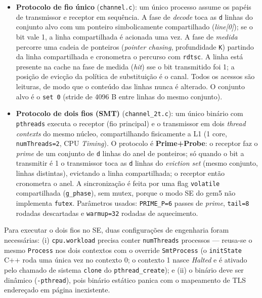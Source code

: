 \begin{itemize}
    \item \textbf{Protocolo de fio único} (\texttt{channel.c}): um único
          processo assume os papéis de transmissor e receptor em sequência.
          A fase de \textit{decode} toca as \texttt{d} linhas do conjunto
          alvo com um ponteiro simbolicamente compartilhado
          (\textit{line[0]}); se o bit vale 1, a linha compartilhada é
          acionada uma vez. A fase de \textit{medida} percorre uma cadeia de
          ponteiros (\textit{pointer chasing}, profundidade \texttt{K})
          partindo da linha compartilhada e cronometra o percurso com
          \texttt{rdtsc}. A linha está presente na cache na fase de medida
          (\textit{hit}) sse o bit transmitido foi 1; a posição de evicção da
          política de substituição é o canal. Todos os acessos são leituras, de
          modo que o conteúdo das linhas nunca é alterado. O conjunto alvo é o
          \texttt{set 0} (stride de 4096 B entre linhas do mesmo conjunto).
    \item \textbf{Protocolo de dois fios (SMT)} (\texttt{channel\_2t.c}):
          um único binário com \texttt{pthreads} executa o receptor (fio
          principal) e o transmissor em dois \textit{thread contexts} do
          mesmo núcleo, compartilhando fisicamente a L1 (1 core,
          \texttt{numThreads=2}, CPU \textit{Timing}). O protocolo é
          \textbf{Prime+Probe}: o receptor faz o \textit{prime} de um
          conjunto de \texttt{d} linhas do anel de ponteiros; só quando o bit
          a transmitir é 1 o transmissor toca as \texttt{d} linhas do
          \textit{eviction set} (mesmo conjunto, linhas distintas), evictando
          a linha compartilhada; o receptor então cronometra o anel. A
          sincronização é feita por uma flag \texttt{volatile} compartilhada
          (\texttt{g\_phase}), sem mutex, porque o modo SE do gem5 não
          implementa \texttt{futex}. Parâmetros usados: \texttt{PRIME\_P=6}
          passes de \textit{prime}, \texttt{tail=8} rodadas descartadas e
          \texttt{warmup=32} rodadas de aquecimento.
\end{itemize}

Para executar o dois fios no SE, duas configurações de engenharia foram
necessárias: (i) \texttt{cpu.workload} precisa conter \texttt{numThreads}
processos --- reusa-se o mesmo \texttt{Process} nos dois contextos com o
override \texttt{SmtProcess} (o \texttt{initState} C++ roda uma única vez no
contexto 0; o contexto 1 nasce \textit{Halted} e é ativado pelo
chamado de sistema \texttt{clone} do \texttt{pthread\_create}); e (ii) o
binário deve ser dinâmico (\texttt{-pthread}), pois binário estático panica
com o mapeamento de TLS endereçado em página inexistente.

